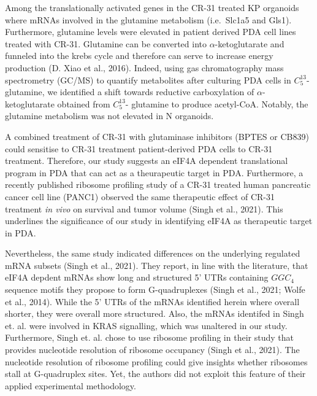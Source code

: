 \documentclass[12pt,openany]{book}
\begin{document}
Among the translationally activated genes in the CR-31 treated KP
organoids where mRNAs involved in the glutamine metabolism (i.e.~Slc1a5
and Gls1). Furthermore, glutamine levels were elevated in patient
derived PDA cell lines treated with CR-31. Glutamine can be converted
into \(\alpha\)-ketoglutarate and funneled into the krebs cycle and
therefore can serve to increase energy production (D. Xiao et al.,
2016). Indeed, using gas chromatography mass spectrometry (GC/MS) to
quantify metabolites after culturing PDA cells in \(C_5^{13}\)-
glutamine, we identified a shift towards reductive carboxylation of
\(\alpha\)-ketoglutarate obtained from \(C_5^{13}\)- glutamine to
produce acetyl-CoA. Notably, the glutamine metabolism was not elevated
in N organoids.

A combined treatment of CR-31 with glutaminase inhibitors (BPTES or
CB839) could sensitise to CR-31 treatment patient-derived PDA cells to
CR-31 treatment. Therefore, our study suggests an eIF4A dependent
translational program in PDA that can act as a theurapeutic target in
PDA. Furthermore, a recently published ribosome profiling study of a
CR-31 treated human pancreatic cancer cell line (PANC1) observed the
same therapeutic effect of CR-31 treatment \emph{in vivo} on survival
and tumor volume (Singh et al., 2021). This underlines the significance
of our study in identifying eIF4A as therapeutic target in PDA.

Nevertheless, the same study indicated differences on the underlying
regulated mRNA subsets (Singh et al., 2021). They report, in line with
the literature, that eIF4A depdent mRNAs show long and structured 5'
UTRs containing \(GGC_4\) sequence motifs they propose to form
G-quadruplexes (Singh et al., 2021; Wolfe et al., 2014). While the 5'
UTRs of the mRNAs identified herein where overall shorter, they were
overall more structured. Also, the mRNAs identifed in Singh et. al. were
involved in KRAS signalling, which was unaltered in our study.
Furthermore, Singh et. al. chose to use ribosome profiling in their
study that provides nucleotide resolution of ribosome occupancy (Singh
et al., 2021). The nucleotide resolution of ribosome profiling could
give insights whether ribosomes stall at G-quadruplex sites. Yet, the
authors did not exploit this feature of their applied experimental
methodology.
\end{document}

